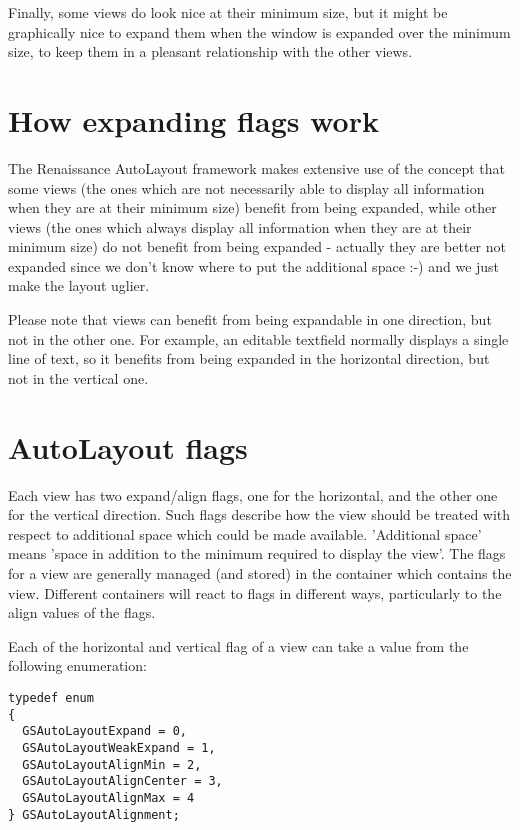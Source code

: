 Finally, some views do look nice at their minimum size, but it might
be graphically nice to expand them when the window is expanded over
the minimum size, to keep them in a pleasant relationship with the
other views.

\section{How expanding flags work}
The Renaissance AutoLayout framework makes extensive use of the
concept that some views (the ones which are not necessarily able to
display all information when they are at their minimum size) benefit
from being expanded, while other views (the ones which always display
all information when they are at their minimum size) do not benefit
from being expanded - actually they are better not expanded since we
don't know where to put the additional space :-) and we just make the
layout uglier.

Please note that views can benefit from being expandable in one
direction, but not in the other one.  For example, an editable
textfield normally displays a single line of text, so it benefits from
being expanded in the horizontal direction, but not in the vertical
one.

\section{AutoLayout flags}\label{autolayout-flags}
Each view has two expand/align flags, one for the horizontal, and the
other one for the vertical direction.  Such flags describe how the
view should be treated with respect to additional space which could be
made available.  'Additional space' means 'space in addition to the
minimum required to display the view'.  The flags for a view are
generally managed (and stored) in the container which contains the
view.  Different containers will react to flags in different ways,
particularly to the align values of the flags.

Each of the horizontal and vertical flag of a view can take a value
from the following enumeration:
\begin{verbatim}
typedef enum 
{
  GSAutoLayoutExpand = 0,
  GSAutoLayoutWeakExpand = 1,
  GSAutoLayoutAlignMin = 2,
  GSAutoLayoutAlignCenter = 3,
  GSAutoLayoutAlignMax = 4
} GSAutoLayoutAlignment;
\end{verbatim}

